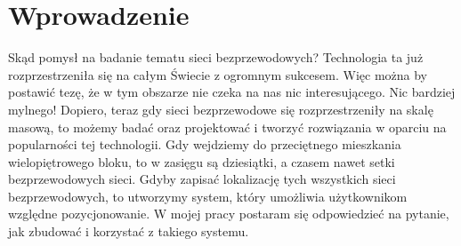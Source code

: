 \chapter*{Wprowadzenie}
\label{ch:wprowadz}

Skąd pomysł na badanie tematu sieci bezprzewodowych? Technologia ta już rozprzestrzeniła się na całym Świecie z ogromnym sukcesem. Więc można by postawić tezę, że w tym obszarze nie czeka na nas nic interesującego. Nic bardziej mylnego! Dopiero, teraz gdy sieci bezprzewodowe się rozprzestrzeniły na skalę masową, to możemy badać oraz projektować i tworzyć rozwiązania w oparciu na popularności tej technologii. Gdy wejdziemy do przeciętnego mieszkania wielopiętrowego bloku, to w zasięgu są dziesiątki, a czasem nawet setki bezprzewodowych sieci. Gdyby zapisać lokalizację tych wszystkich sieci bezprzewodowych, to utworzymy system, który umożliwia użytkownikom względne pozycjonowanie. W mojej pracy postaram się odpowiedzieć na pytanie, jak zbudować i korzystać z takiego systemu.
